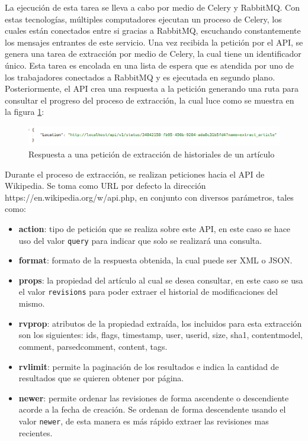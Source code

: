 La ejecución de esta tarea se lleva a cabo por medio de Celery y RabbitMQ.
Con estas tecnologías, múltiples computadores ejecutan un proceso de Celery, los
cuales están conectados entre si gracias a RabbitMQ, escuchando constantemente los mensajes entrantes de este servicio.
Una vez recibida la petición por el API, se genera una tarea de extracción por medio de Celery, la cual tiene un identificador único. Esta tarea es encolada en una lista de
espera que es atendida por uno de los trabajadores conectados a RabbitMQ y es ejecutada en segundo plano.
Posteriormente, el API crea una respuesta a la petición generando una ruta para consultar el progreso
del proceso de extracción, la cual luce como se muestra en la figura \ref{fig:extract_response}:

\begin{figure}[H]
	\centering
		\includegraphics[width=1\textwidth]{figures/extract_response}
	\caption{Respuesta a una petición de extracción de historiales de un artículo}
	\label{fig:extract_response}
\end{figure}

Durante el proceso de extracción, se realizan peticiones hacia el API de Wikipedia.
Se toma como URL por defecto la dirección https://en.wikipedia.org/w/api.php, en conjunto con diversos parámetros, tales como:

\begin{itemize}
	\item \textbf{action}: tipo de petición que se realiza sobre este API, en este caso se hace uso del valor \texttt{query} para indicar que solo se realizará una consulta.

	\item \textbf{format}: formato de la respuesta obtenida, la cual puede ser XML o JSON.

	\item \textbf{props}: la propiedad del artículo al cual se desea consultar, en este caso se usa el valor \texttt{revisions} para poder extraer el historial de modificaciones del mismo.

	\item \textbf{rvprop}: atributos de la propiedad extraída, los incluidos para esta extracción son los siguientes: ids, flags, timestamp, user, userid, size, sha1, contentmodel, comment, parsedcomment, content, tags.

	\item \textbf{rvlimit}: permite la paginación de los resultados e indica la cantidad de resultados que se quieren obtener por página.

	\item \textbf{newer}: permite ordenar las revisiones de forma ascendente o descendiente acorde a la fecha de creación. Se ordenan de forma descendente usando el valor \texttt{newer}, de esta manera es más rápido extraer las revisiones mas recientes.
\end{itemize}

